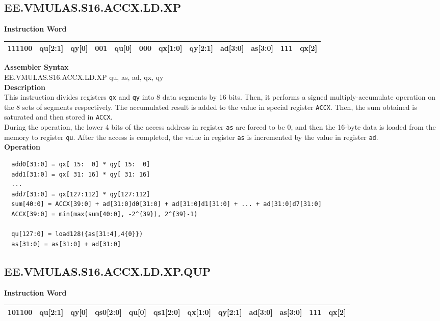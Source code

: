 \clearpage
\subsection{EE.VMULAS.S16.ACCX.LD.XP}\label{instruction:EEVMULASS16ACCXLDXP}
\setlength\tabcolsep{6pt}
\textbf{Instruction Word} \\
\begin{tabular}{|c|c|c|c|c|c|c|c|c|c|c|c|}
	\hline
	111100 & qu[2:1] & qy[0] & 001 & qu[0] & 000 & qx[1:0] & qy[2:1] & ad[3:0] & as[3:0] & 111 & qx[2] \\
	\hline
\end{tabular}

\textbf{Assembler Syntax} \\
EE.VMULAS.S16.ACCX.LD.XP qu, as, ad, qx, qy \\
\textbf{Description} \\
This instruction divides registers \lstinline{qx} and \lstinline{qy} into 8 data segments by 16 bits. Then, it performs a signed multiply-accumulate operation on the 8 sets of segments respectively. The accumulated result is added to the value in special register \lstinline{ACCX}. Then, the sum obtained is saturated and then stored in \lstinline{ACCX}.\\
During the operation, the lower 4 bits of the access address in register \lstinline{as} are forced to be 0, and then the 16-byte data is loaded from the memory to register \lstinline{qu}. After the access is completed, the value in register \lstinline{as} is incremented by the value in register \lstinline{ad}.\\
\textbf{Operation}
\begin{lstlisting}
  add0[31:0] = qx[ 15:  0] * qy[ 15:  0]
  add1[31:0] = qx[ 31: 16] * qy[ 31: 16]
  ...
  add7[31:0] = qx[127:112] * qy[127:112]
  sum[40:0] = ACCX[39:0] + ad[31:0]d0[31:0] + ad[31:0]d1[31:0] + ... + ad[31:0]d7[31:0]
  ACCX[39:0] = min(max(sum[40:0], -2^{39}), 2^{39}-1)

  qu[127:0] = load128({as[31:4],4{0}})
  as[31:0] = as[31:0] + ad[31:0]
\end{lstlisting}

\clearpage
\subsection{EE.VMULAS.S16.ACCX.LD.XP.QUP}\label{instruction:EEVMULASS16ACCXLDXPQUP}
\setlength\tabcolsep{6pt}
\textbf{Instruction Word} \\
\begin{tabular}{|c|c|c|c|c|c|c|c|c|c|c|c|}
	\hline
	101100 & qu[2:1] & qy[0] & qs0[2:0] & qu[0] & qs1[2:0] & qx[1:0] & qy[2:1] & ad[3:0] & as[3:0] & 111 & qx[2] \\
	\hline
\end{tabular}

